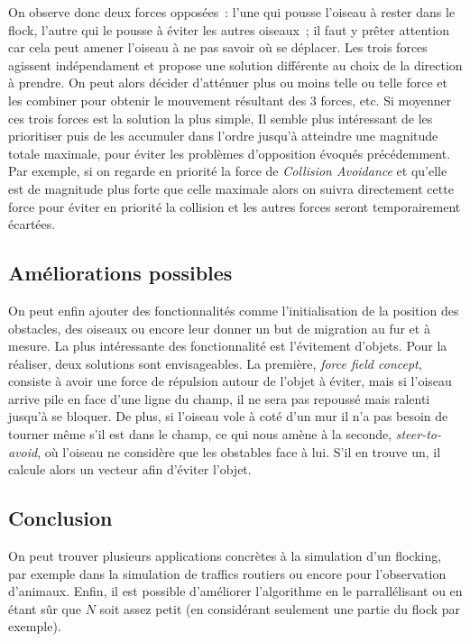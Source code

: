 \documentclass{article}
\begin{document}
On observe donc deux forces opposées~: l'une qui pousse l'oiseau à rester dans le flock, l'autre qui le pousse à éviter les autres oiseaux~; il faut y prêter attention car cela peut amener l'oiseau à ne pas savoir où se déplacer.
Les trois forces agissent indépendament et propose une solution différente au choix de la direction à prendre. On peut alors décider d'atténuer plus ou moins telle ou telle force et les combiner pour obtenir le mouvement résultant des 3 forces, etc. Si moyenner ces trois forces est la solution la plus simple, Il semble plus intéressant de les prioritiser puis de les accumuler dans l'ordre jusqu'à atteindre une magnitude totale maximale, pour éviter les problèmes d'opposition évoqués précédemment. Par exemple, si on regarde en priorité la force de \emph{Collision Avoidance} et qu'elle est de magnitude plus forte que celle maximale alors on suivra directement cette force pour éviter en priorité la collision et les autres forces seront temporairement écartées.

\subsection{Améliorations possibles}
On peut enfin ajouter des fonctionnalités comme l'initialisation de la position des obstacles, des oiseaux ou encore leur donner un but de migration au fur et à mesure. La plus intéressante des fonctionnalité est l'évitement d'objets. Pour la réaliser, deux solutions sont envisageables. La première, \emph{force field concept}, consiste à avoir une force de répulsion autour de l'objet à éviter, mais si l'oiseau arrive pile en face d'une ligne du champ, il ne sera pas repoussé mais ralenti jusqu'à se bloquer. De plus, si l'oiseau vole à coté d'un mur il n'a pas besoin de tourner même s'il est dans le champ, ce qui nous amène à la seconde, \emph{steer-to-avoid}, où l'oiseau ne considère que les obstables face à lui. S'il en trouve un, il calcule alors un vecteur afin d'éviter l'objet.

\subsection{Conclusion}
On peut trouver plusieurs applications concrètes à la simulation d'un flocking, par exemple dans la simulation de traffics routiers ou encore pour l'observation d'animaux.
Enfin, il est possible d'améliorer l'algorithme en le parrallélisant ou en étant sûr que $N$ soit assez petit (en considérant seulement une partie du flock par exemple).
\end{document}
